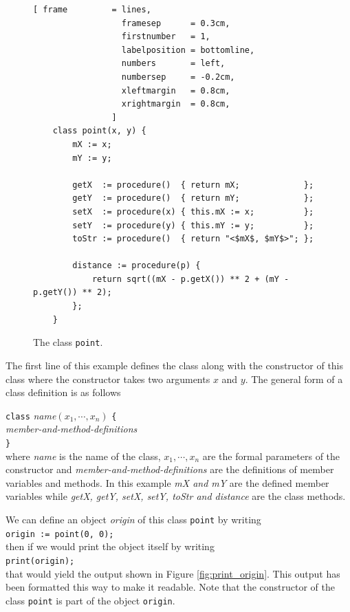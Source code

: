 \documentclass[11pt]{report}
\begin{document}
\begin{figure}[!ht]
\centering
\begin{Verbatim}[ frame         = lines, 
                  framesep      = 0.3cm, 
                  firstnumber   = 1,
                  labelposition = bottomline,
                  numbers       = left,
                  numbersep     = -0.2cm,
                  xleftmargin   = 0.8cm,
                  xrightmargin  = 0.8cm,
                ]
    class point(x, y) {
        mX := x;
        mY := y;
    
        getX  := procedure()  { return mX;             };
        getY  := procedure()  { return mY;             };
        setX  := procedure(x) { this.mX := x;          };
        setY  := procedure(y) { this.mY := y;          };
        toStr := procedure()  { return "<$mX$, $mY$>"; };

        distance := procedure(p) {
            return sqrt((mX - p.getX()) ** 2 + (mY - p.getY()) ** 2);
        };
    }
\end{Verbatim}
\vspace*{-0.3cm}
\caption{The class \texttt{point}.}
\label{fig:point.stlx}
\end{figure}

The first line of this example defines the class along with the constructor of this class where the constructor takes two arguments $x$ and $y$. The general form of a class definition is as follows

\vspace{0.2cm}
\hspace*{0.8cm}
\texttt{class} \textsl{name}$(x_1, \cdots, x_n)$ \texttt{\{}  
\\
\hspace*{2.0cm} \textsl{member-and-method-definitions}
\\
\hspace*{1.3cm}
\texttt{\}}
\\[0.2cm]
where \textsl{name} is the name of the class, $x_1, \cdots, x_n$ are the formal parameters of the constructor and \textsl{member-and-method-definitions} are the definitions of member variables and methods. In this example \textsl{mX and mY} are the defined member variables while \textsl{getX, getY, setX, setY, toStr and distance} are the class methods.

We can define an object \textsl{origin} of this class
\texttt{point} by writing
\\[0.2cm]
\hspace*{1.3cm}
\texttt{origin := point(0, 0);}
\\[0.2cm]
then if we would print the object itself by writing 
\\[0.2cm]
\hspace*{1.3cm}
\texttt{print(origin);}
\\[0.2cm]
that would yield the output shown in Figure \ref{fig:print_origin}. This output has been formatted this way to make it readable. Note that the constructor of the class \texttt{point} is part of the object \texttt{origin}.
\end{document}
